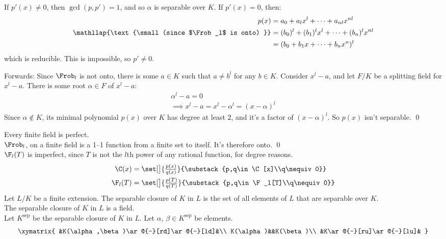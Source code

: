 If $p'(x)\neq0$, then $\gcd(p,p')=1$, and so $\alpha$ is separable over $K$.  If $p'(x)=0$, then:
\begin{align*}
p(x) &= a_0 + a_l x^l + \dotsb + a_{nl}x^{nl} \\
\mathllap{\text{\small(since $\Frob_l$ is onto) }} &= (b_0)^l + (b_1)^l x^l + \dotsb + (b_n)^l x^{nl} \\
&= (b_0+b_1x+\dotsb+b_nx^n)^l
\end{align*}
which is reducible.  This is impossible, so $p'\neq0$.

Forwards: Since $\Frob_l$ is not onto, there is some $a\in K$ such that $a\neq b^l$ for any $b\in K$.  Consider $x^l-a$, and let $F/K$ be a splitting field for $x^l-a$.  There is some root $\alpha\in F$ of $x^l-a$:
\begin{gather*}
\alpha^l - a = 0 \\
\implies x^l - a = x^l - \alpha^l = (x-\alpha)^l
\end{gather*}
Since $\alpha\notin K$, its minimal polynomial $p(x)$ over $K$ has degree at least $2$, and it's a factor of $(x-\alpha)^l$.  So $p(x)$ isn't separable. \qed

\thm Every finite field is perfect. \\
\pf $\Frob_l$, on a finite field is a 1--1 function from a finite set to itself.  It's therefore onto. \qed \\
\eg $\F_l(T)$ is imperfect, since $T$ is not the $l$th power of any rational function, for degree reasons.
\begin{align*}
\C(x) &= \set[\big]{\tfrac{p(x)}{q(x)}}{\substack{p,q\in\C[x]\\q\nequiv0}} \\
\F_l(T) &= \set[\big]{\tfrac{p(T)}{q(T)}}{\substack{p,q\in\F_l[T]\\q\nequiv0}}
\end{align*}
 Let $L/K$ be a finite extension.  The separable closure of $K$ in $L$ is the set of all elements of $L$ that are separable over $K$.  %
\\
\thm The separable closure of $K$ in $L$ is a field. \\
\pf Let $K^\text{sep}$ be the separable closure of $K$ in $L$.  Let $\alpha$, $\beta\in K^\text{sep}$ be elements.
\[ \xymatrix{
&K(\alpha,\beta)\ar@{-}[rd]\ar@{-}[ld]&\\
K(\alpha)&&K(\beta)\\
&K\ar@{-}[ru]\ar@{-}[lu]&
} \]
